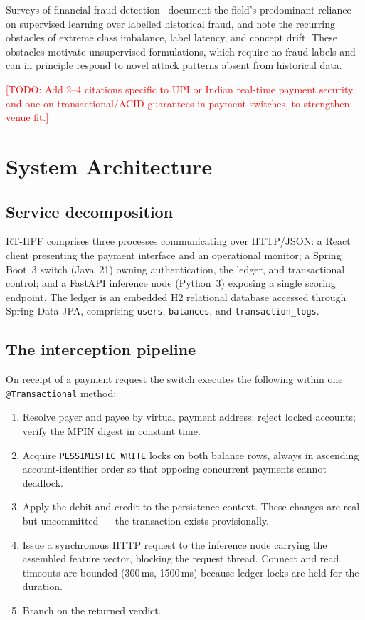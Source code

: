 \documentclass[conference]{IEEEtran}
\newcommand{\todo}[1]{\textcolor{red}{[TODO: #1]}}
\begin{document}
Surveys of financial fraud detection~\cite{abdallah2016,adewumi2017} document
the field's predominant reliance on supervised learning over labelled
historical fraud, and note the recurring obstacles of extreme class
imbalance, label latency, and concept drift. These obstacles motivate
unsupervised formulations, which require no fraud labels and can in principle
respond to novel attack patterns absent from historical data.

\todo{Add 2--4 citations specific to UPI or Indian real-time payment
security, and one on transactional/ACID guarantees in payment switches, to
strengthen venue fit.}

\section{System Architecture}
\label{sec:arch}

\subsection{Service decomposition}

RT-IIPF comprises three processes communicating over HTTP/JSON: a React
client presenting the payment interface and an operational monitor; a Spring
Boot~3 switch (Java~21) owning authentication, the ledger, and transactional
control; and a FastAPI inference node (Python~3) exposing a single scoring
endpoint. The ledger is an embedded H2 relational database accessed through
Spring Data JPA, comprising \texttt{users}, \texttt{balances}, and
\texttt{transaction\_logs}.

\subsection{The interception pipeline}

On receipt of a payment request the switch executes the following within one
\texttt{@Transactional} method:

\begin{enumerate}
\item Resolve payer and payee by virtual payment address; reject locked
accounts; verify the MPIN digest in constant time.
\item Acquire \texttt{PESSIMISTIC\_WRITE} locks on both balance rows, always
in ascending account-identifier order so that opposing concurrent payments
cannot deadlock.
\item Apply the debit and credit to the persistence context. These changes
are real but uncommitted --- the transaction exists provisionally.
\item Issue a synchronous HTTP request to the inference node carrying the
assembled feature vector, blocking the request thread. Connect and read
timeouts are bounded (300\,ms, 1500\,ms) because ledger locks are held for
the duration.
\item Branch on the returned verdict.
\end{enumerate}
\end{document}

